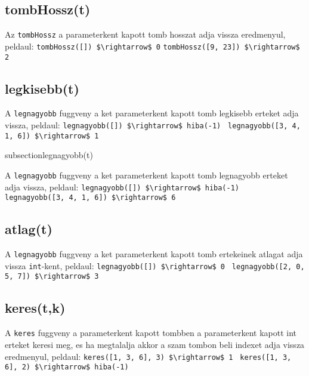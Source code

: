 \documentclass{article}
\begin{document}
\subsection{tombHossz(t)}
Az \lstinline{tombHossz} a parameterkent kapott tomb hosszat adja vissza eredmenyul, peldaul:\newline
\lstinline[mathescape]{tombHossz([]) $\rightarrow$ 0}\newline
\lstinline[mathescape]{tombHossz([9, 23]) $\rightarrow$ 2}\newline

\subsection{legkisebb(t)}

A \lstinline{legnagyobb} fuggveny a ket parameterkent kapott tomb legkisebb erteket adja vissza, peldaul:\newline
\lstinline[mathescape]{legnagyobb([]) $\rightarrow$ hiba(-1) }\newline
\lstinline[mathescape]{legnagyobb([3, 4, 1, 6]) $\rightarrow$ 1 }\newline

subsection{legnagyobb(t)}

A \lstinline{legnagyobb} fuggveny a ket parameterkent kapott tomb legnagyobb erteket adja vissza, peldaul:\newline
\lstinline[mathescape]{legnagyobb([]) $\rightarrow$ hiba(-1) }\newline
\lstinline[mathescape]{legnagyobb([3, 4, 1, 6]) $\rightarrow$ 6 }\newline

\subsection{atlag(t)}

A \lstinline{legnagyobb} fuggveny a ket parameterkent kapott tomb ertekeinek atlagat adja vissza \lstinline{int}-kent, peldaul:\newline
\lstinline[mathescape]{legnagyobb([]) $\rightarrow$ 0 }\newline
\lstinline[mathescape]{legnagyobb([2, 0, 5, 7]) $\rightarrow$ 3 }\newline

\subsection{keres(t,k)}

A \lstinline{keres} fuggveny a parameterkent kapott tombben a parameterkent kapott int erteket keresi meg, es ha megtalalja akkor
a szam tombon beli indexet adja vissza eredmenyul, peldaul:\newline
\lstinline[mathescape]{keres([1, 3, 6], 3) $\rightarrow$ 1 }\newline
\lstinline[mathescape]{keres([1, 3, 6], 2) $\rightarrow$ hiba(-1) }\newline
\end{document}
